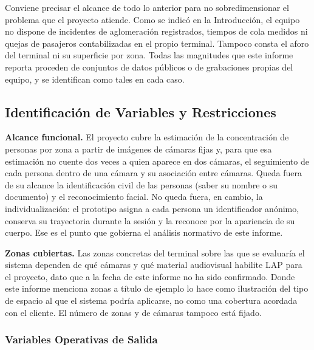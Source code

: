 Conviene precisar el alcance de todo lo anterior para no sobredimensionar el problema que
el proyecto atiende. Como se indicó en la Introducción, el equipo no dispone de incidentes de
aglomeración registrados, tiempos de cola medidos ni quejas de pasajeros contabilizadas en el
propio terminal. Tampoco consta el aforo del terminal ni su superficie por
zona. Todas las magnitudes que este informe
reporta proceden de conjuntos de datos públicos o de grabaciones propias del equipo, y se
identifican como tales en cada caso.

\subsection{Identificación de Variables y Restricciones}
\label{subsec:variables-restricciones}

\textbf{Alcance funcional.} El proyecto cubre la estimación de la concentración de personas
por zona a partir de imágenes de cámaras fijas y, para que esa estimación no cuente dos veces a
quien aparece en dos cámaras, el seguimiento de cada persona dentro de una cámara y su
asociación entre cámaras. Queda fuera de su alcance la identificación civil de las personas
(saber su nombre o su documento) y el reconocimiento facial. No queda fuera, en cambio, la
individualización: el prototipo asigna a cada persona un identificador anónimo, conserva su
trayectoria durante la sesión y la reconoce por la apariencia de su cuerpo. Ese es el punto que
gobierna el análisis normativo de este informe.

\textbf{Zonas cubiertas.} Las zonas concretas del terminal sobre las que se evaluaría el sistema
dependen de qué cámaras y qué material audiovisual habilite LAP para el proyecto, dato que a
la fecha de este informe no ha sido confirmado. Donde este informe menciona zonas a título de
ejemplo lo hace como ilustración del tipo de espacio al que el sistema podría aplicarse, no como
una cobertura acordada con el cliente. El número de zonas y de cámaras tampoco está
fijado.

\subsubsection{Variables Operativas de Salida}

